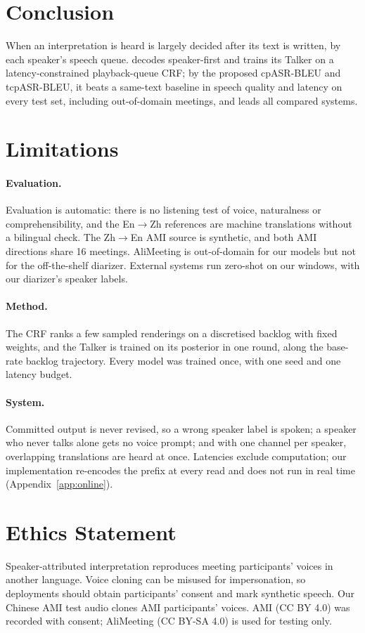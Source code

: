 \section{Conclusion}
\label{sec:conclusion}

When an interpretation is heard is largely decided after its text is written, by each speaker's speech queue.
\sys{} decodes speaker-first and trains its Talker on a latency-constrained playback-queue CRF; by the proposed
cpASR-BLEU and tcpASR-BLEU, it beats a same-text baseline in speech quality and latency on every test set,
including out-of-domain meetings, and leads all compared systems.

\section*{Limitations}
\label{sec:res-hygiene}

\paragraph{Evaluation.} Evaluation is automatic: there is no listening test of voice, naturalness or
comprehensibility, and the En$\rightarrow$Zh references are machine translations without a bilingual check. The
Zh$\rightarrow$En AMI source is synthetic, and both AMI directions share 16 meetings. AliMeeting is
out-of-domain for our models but not for the off-the-shelf diarizer. External systems run zero-shot on our windows,
with our diarizer's speaker labels.

\paragraph{Method.} The CRF ranks a few sampled renderings on a discretised backlog with fixed weights, and the Talker
is trained on its posterior in one round, along the base-rate backlog trajectory. Every model was trained once, with
one seed and one latency budget.

\paragraph{System.} Committed output is never revised, so a wrong speaker label is spoken; a speaker who never talks
alone gets no voice prompt; and with one channel per speaker, overlapping translations are heard at once. Latencies
exclude computation; our implementation re-encodes the prefix at every read and does not run in real time
(Appendix~\ref{app:online}).

\section*{Ethics Statement}

Speaker-attributed interpretation reproduces meeting participants' voices in another language. Voice cloning can be
misused for impersonation, so deployments should obtain participants' consent and mark synthetic speech. Our Chinese AMI
test audio clones AMI participants' voices. AMI (CC BY 4.0) was recorded with consent; AliMeeting (CC BY-SA 4.0) is used
for testing only.
